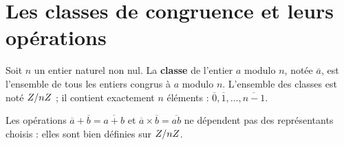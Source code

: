 \section{Les classes de congruence et leurs opérations}

\begin{definition}
Soit $n$ un entier naturel non nul. La \textbf{classe} de l'entier $a$ modulo
$n$, notée $\overline a$, est l'ensemble de tous les entiers congrus à $a$
modulo $n$. L'ensemble des classes est noté $Z/nZ$ ; il contient exactement
$n$ éléments : $\overline 0, \overline 1, \dots, \overline{n-1}$.
\end{definition}

\begin{propriete}[opérations]
Les opérations $\overline a+\overline b = \overline{a+b}$ et
$\overline a \times \overline b = \overline{ab}$ ne dépendent pas des
représentants choisis : elles sont bien définies sur $Z/nZ$.
\end{propriete}

